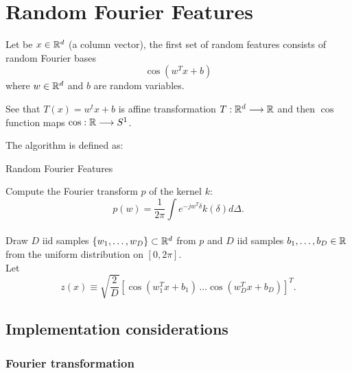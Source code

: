 \section{Random Fourier Features}

Let be $x \in \mathbb{R}^d$  (a column vector), the first set of random features consists of random 
Fourier bases
\begin{equation}
    \cos(w^T x + b) 
\end{equation}
where $w \in \mathbb{R}^d$  and $b$ are random variables. 

See that $T(x) = w^t x +b$ is affine transformation
$T:\mathbb{R}^d \longrightarrow \mathbb{R}$  and then $\cos$ function maps
$\cos: \mathbb{R}  \longrightarrow S^1$. 

The algorithm is defined as: 

\begin{algorithm}[hbt!]
    \caption{Random Fourier Features}\label{alg:two}

     Compute the Fourier transform $p$ of the kernel $k$: 
    \begin{equation}\label{eq:fourier_transformation}
        p(w) = \frac{1}{2 \pi}
        \int
        e^{-jw^T \delta}k(\delta) 
        d \Delta. 
     \end{equation}
        \\
     Draw $D$ iid samples 
     $\{w_1, \ldots, w_D \} \subset \mathbb{R}^d$ from $p$ and
     $D$ iid samples $b_1, \ldots, b_D \in \mathbb{R}$
     from the uniform distribution on 
     $[0, 2\pi]$. 
     \\
     Let 
     \begin{equation}
        z(x)
        \equiv
        \sqrt{\frac{2}{D}}
        \left[ 
            \cos(w_1^T x + b_1) 
            \, 
            \ldots
            \cos(w_D^T x + b_D) 
            \right]^T. 
     \end{equation}
    \end{algorithm}


\subsection{Implementation considerations}
\subsubsection{Fourier transformation}

